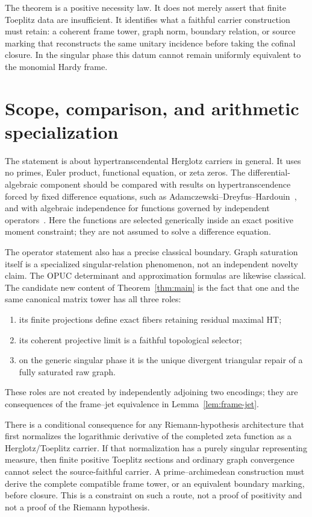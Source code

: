 \documentclass[11pt]{article}
\begin{document}
The theorem is a positive necessity law.  It does not merely assert that finite Toeplitz data are
insufficient.  It identifies what a faithful carrier construction must retain: a coherent frame
tower, graph norm, boundary relation, or source marking that reconstructs the same unitary
incidence before taking the cofinal closure.  In the singular phase this datum cannot remain
uniformly equivalent to the monomial Hardy frame.

\section{Scope, comparison, and arithmetic specialization}\label{sec:scope}

The statement is about hypertranscendental Herglotz carriers in general.  It uses no primes,
Euler product, functional equation, or zeta zeros.  The differential-algebraic component should be
compared with results on hypertranscendence forced by fixed difference equations, such as
Adamczewski--Dreyfus--Hardouin~\cite{ADH2021}, and with algebraic independence for functions
governed by independent operators~\cite{ADHW2024}.  Here the functions are selected generically
inside an exact positive moment constraint; they are not assumed to solve a difference equation.

The operator statement also has a precise classical boundary.  Graph saturation itself is a
specialized singular-relation phenomenon, not an independent novelty claim.  The OPUC determinant
and approximation formulas are likewise classical.  The candidate new content of
Theorem~\ref{thm:main} is the fact that one and the same canonical matrix tower has all three
roles:
\begin{enumerate}[leftmargin=*]
  \item its finite projections define exact fibers retaining residual maximal HT;
  \item its coherent projective limit is a faithful topological selector;
  \item on the generic singular phase it is the unique divergent triangular repair of a fully
  saturated raw graph.
\end{enumerate}
These roles are not created by independently adjoining two encodings; they are consequences of
the frame--jet equivalence in Lemma~\ref{lem:frame-jet}.

There is a conditional consequence for any Riemann-hypothesis architecture that first normalizes
the logarithmic derivative of the completed zeta function as a Herglotz/Toeplitz carrier.  If that
normalization has a purely singular representing measure, then finite positive Toeplitz sections
and ordinary graph convergence cannot select the source-faithful carrier.  A prime--archimedean
construction must derive the complete compatible frame tower, or an equivalent boundary marking,
before closure.  This is a constraint on such a route, not a proof of positivity and not a proof of
the Riemann hypothesis.
\end{document}
